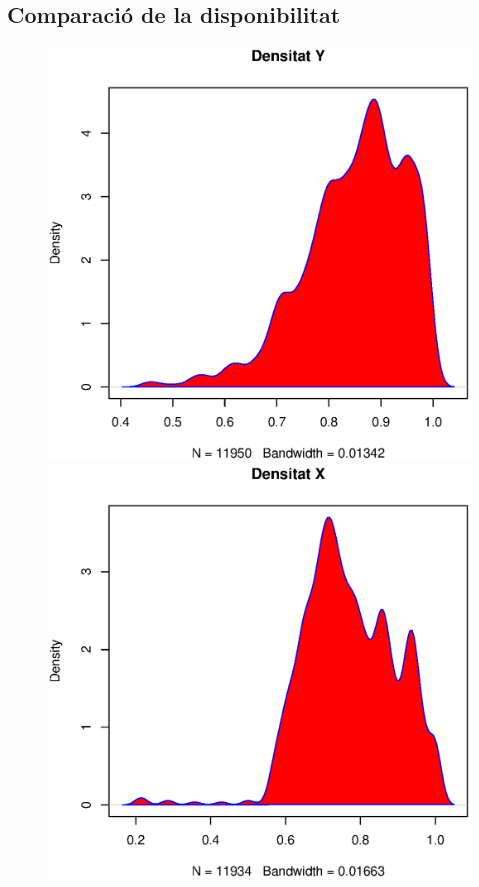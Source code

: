 \begin{figure}[h!]
\begin{minipage}{0.45\linewidth}
\end{minipage}
\end{figure}



\subsection{Comparació de la disponibilitat}


\begin{figure}[h!]
\begin{minipage}{0.5\linewidth}
\includegraphics[width=1\linewidth]{./images/no_DENS.eps}
\caption{}
\end{minipage}
\hfill
\begin{minipage}{0.5\linewidth}
\includegraphics[width=1\linewidth]{./images/si_DENS.eps}
\caption{}
\end{minipage}
\end{figure}
